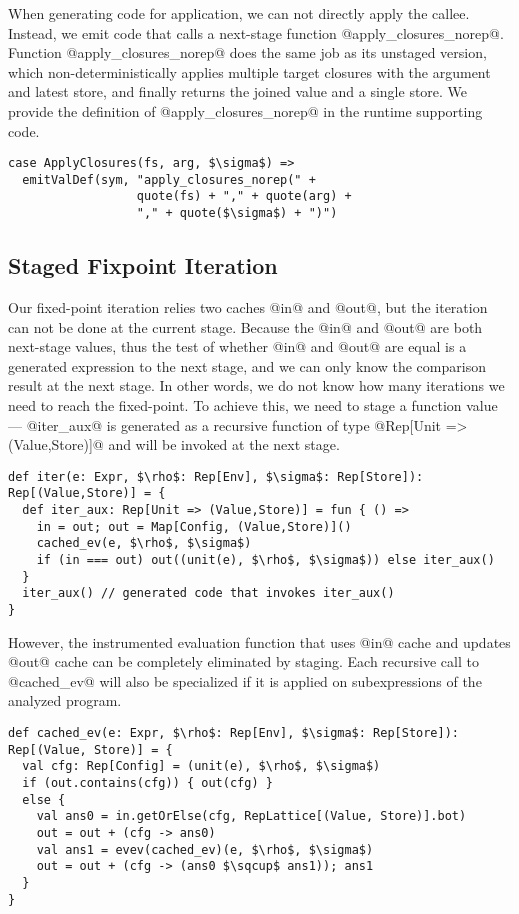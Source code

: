 When generating code for application, we can not directly apply the callee.
Instead, we emit code that calls a next-stage function @apply_closures_norep@.
Function @apply_closures_norep@ does the same job as its unstaged version,
which non-deterministically applies multiple target closures with the argument
and latest store, and finally returns the joined value and a single store.
We provide the definition of @apply_closures_norep@ in the runtime supporting code.

\begin{lstlisting}
case ApplyClosures(fs, arg, $\sigma$) =>
  emitValDef(sym, "apply_closures_norep(" + 
                  quote(fs) + "," + quote(arg) + 
                  "," + quote($\sigma$) + ")")
\end{lstlisting}

\subsection{Staged Fixpoint Iteration} 

Our fixed-point iteration relies two caches @in@ and @out@, but the iteration 
can not be done at the current stage.
Because the @in@ and @out@ are both next-stage values, thus the test of whether 
@in@ and @out@ are equal is a generated expression to the next stage, and we can only 
know the comparison result at the next stage. 
In other words, we do not know how many iterations we need to reach the fixed-point.
To achieve this, we need to stage a function value --- @iter_aux@ is generated as a 
recursive function of type @Rep[Unit => (Value,Store)]@ and will be invoked at the next stage.

\begin{lstlisting}
def iter(e: Expr, $\rho$: Rep[Env], $\sigma$: Rep[Store]): 
Rep[(Value,Store)] = {
  def iter_aux: Rep[Unit => (Value,Store)] = fun { () =>
    in = out; out = Map[Config, (Value,Store)]()
    cached_ev(e, $\rho$, $\sigma$)
    if (in === out) out((unit(e), $\rho$, $\sigma$)) else iter_aux()
  }
  iter_aux() // generated code that invokes iter_aux()
}
\end{lstlisting}

However, the instrumented evaluation function that uses @in@ cache and updates @out@ cache
can be completely eliminated by staging. Each recursive call to @cached_ev@ will also be specialized
if it is applied on subexpressions of the analyzed program.

\begin{lstlisting}
def cached_ev(e: Expr, $\rho$: Rep[Env], $\sigma$: Rep[Store]): 
Rep[(Value, Store)] = {
  val cfg: Rep[Config] = (unit(e), $\rho$, $\sigma$)
  if (out.contains(cfg)) { out(cfg) }
  else {
    val ans0 = in.getOrElse(cfg, RepLattice[(Value, Store)].bot)
    out = out + (cfg -> ans0)
    val ans1 = evev(cached_ev)(e, $\rho$, $\sigma$)
    out = out + (cfg -> (ans0 $\sqcup$ ans1)); ans1
  }
}
\end{lstlisting}

